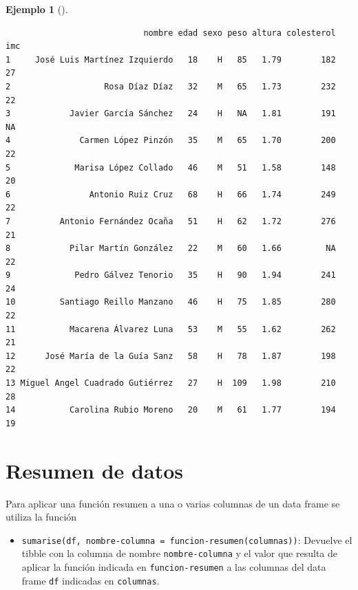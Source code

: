 \documentclass[
  a4paper,
]{scrreport}
\providecommand{\tightlist}{%
  \setlength{\itemsep}{0pt}\setlength{\parskip}{0pt}}\usepackage{longtable,booktabs,array}
\theoremstyle{definition}
\theoremstyle{definition}
\newtheorem{example}{Ejemplo}[chapter]
\theoremstyle{remark}
\begin{document}
\begin{example}[]
\begin{verbatim}
                            nombre edad sexo peso altura colesterol imc
1     José Luis Martínez Izquierdo   18    H   85   1.79        182  27
2                   Rosa Díaz Díaz   32    M   65   1.73        232  22
3            Javier García Sánchez   24    H   NA   1.81        191  NA
4              Carmen López Pinzón   35    M   65   1.70        200  22
5             Marisa López Collado   46    M   51   1.58        148  20
6                Antonio Ruiz Cruz   68    H   66   1.74        249  22
7          Antonio Fernández Ocaña   51    H   62   1.72        276  21
8            Pilar Martín González   22    M   60   1.66         NA  22
9             Pedro Gálvez Tenorio   35    H   90   1.94        241  24
10         Santiago Reillo Manzano   46    H   75   1.85        280  22
11           Macarena Álvarez Luna   53    M   55   1.62        262  21
12      José María de la Guía Sanz   58    H   78   1.87        198  22
13 Miguel Angel Cuadrado Gutiérrez   27    H  109   1.98        210  28
14           Carolina Rubio Moreno   20    M   61   1.77        194  19
\end{verbatim}

\end{example}

\section{Resumen de datos}\label{resumen-de-datos}

Para aplicar una función resumen a una o varias columnas de un data
frame se utiliza la función

\begin{itemize}
\tightlist
\item
  \texttt{sumarise(df,\ nombre-columna\ =\ funcion-resumen(columnas))}:
  Devuelve el tibble con la columna de nombre \texttt{nombre-columna} y
  el valor que resulta de aplicar la función indicada en
  \texttt{funcion-resumen} a las columnas del data frame \texttt{df}
  indicadas en \texttt{columnas}.
\end{itemize}
\end{document}
